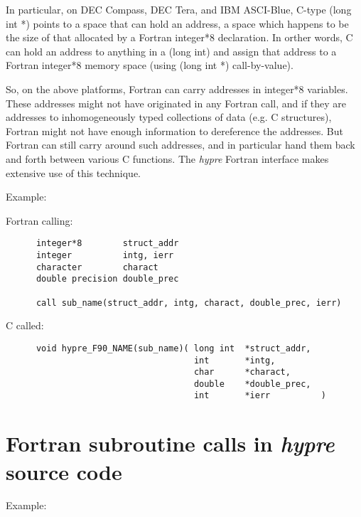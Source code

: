 \vspace{0.2in}


In particular, on DEC Compass, DEC Tera, and IBM ASCI-Blue, C-type
(long int *) points to a space that can hold an address, a space which
happens to be the size of that allocated by a Fortran integer*8 declaration.
In orther words, C can hold an address to anything in a (long int) and
assign that address to a Fortran integer*8 memory space (using (long int *)
call-by-value).

So, on the above platforms, Fortran can carry addresses in integer*8
variables.  These addresses might not have originated in any Fortran call,
and if they are addresses to inhomogeneously typed collections of data
(e.g. C structures), Fortran might not have enough information to dereference
the addresses.  But Fortran can still carry around such addresses, and in
particular hand them back and forth between various C functions.  The
{\itshape hypre} Fortran interface makes extensive use of this technique.

\vspace{0.2in}

\noindent Example:

\vspace{0.1in}

  Fortran calling:
\begin{verbatim}
      integer*8        struct_addr
      integer          intg, ierr
      character        charact
      double precision double_prec

      call sub_name(struct_addr, intg, charact, double_prec, ierr)
\end{verbatim}
  C called:
\begin{verbatim}
      void hypre_F90_NAME(sub_name)( long int  *struct_addr,
                                     int       *intg,
                                     char      *charact,
                                     double    *double_prec,
                                     int       *ierr          )
\end{verbatim}

\section{Fortran subroutine calls in {\itshape hypre} source code}

\vspace{0.2in}

\noindent Example:

\vspace{0.1in}

